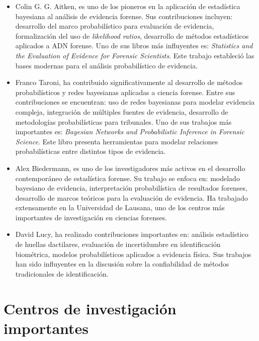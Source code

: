 \documentclass[a4paper,10pt,oneside]{article}
\begin{document}
\begin{itemize} 

\item Colin G. G. Aitken,  es uno de los pioneros en la aplicaci\'on de estad\'istica bayesiana al an\'alisis de evidencia forense. Sus contribuciones incluyen:  desarrollo del marco probabil\'istico para evaluaci\'on de evidencia, formalizaci\'on del uso de \textit{likelihood ratios}, desarrollo de m\'etodos estad\'isticos aplicados a ADN forense. Uno de sus libros m\'as influyentes es: \textit{Statistics and the Evaluation of Evidence for Forensic Scientists}. Este trabajo estableci\'o las bases modernas para el an\'alisis probabil\'istico de evidencia.

\item Franco Taroni, ha contribuido significativamente al desarrollo de m\'etodos probabil\'isticos y redes bayesianas aplicadas a ciencia forense. Entre sus contribuciones se encuentran:  uso de redes bayesianas para modelar evidencia compleja, integraci\'on de m\'ultiples fuentes de evidencia, desarrollo de metodolog\'ias probabil\'isticas para tribunales. Uno de sus trabajos m\'as importantes es: \textit{Bayesian Networks and Probabilistic Inference in Forensic Science}. Este libro presenta herramientas para modelar relaciones probabil\'isticas entre distintos tipos de evidencia.

\item Alex Biedermann, es uno de los investigadores m\'as activos en el desarrollo contempor\'aneo de estad\'istica forense. Su trabajo se enfoca en:  modelado bayesiano de evidencia, interpretaci\'on probabil\'istica de resultados forenses, desarrollo de marcos te\'oricos para la evaluaci\'on de evidencia. Ha trabajado extensamente en la Universidad de Lausana, uno de los centros m\'as importantes de investigaci\'on en ciencias forenses.

\item David Lucy, ha realizado contribuciones importantes en: an\'alisis estad\'istico de huellas dactilares, evaluaci\'on de incertidumbre en identificaci\'on biom\'etrica, modelos probabil\'isticos aplicados a evidencia f\'isica. Sus trabajos han sido influyentes en la discusi\'on sobre la confiabilidad de m\'etodos tradicionales de identificaci\'on.
\end{itemize}

\section{Centros de investigaci\'on importantes}
\end{document}
